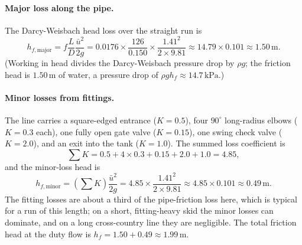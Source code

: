 \paragraph{Major loss along the pipe.} The Darcy-Weisbach head loss
over the straight run is
\[
h_{f,\text{major}} = f\frac{L}{D}\frac{\bar u^2}{2g} = 0.0176\times
\frac{126}{0.150}\times\frac{1.41^2}{2\times9.81} \approx 14.79\times
0.101 \approx 1.50\,\si{\meter}.
\]
(Working in head divides the Darcy-Weisbach pressure drop by $\rho g$;
the friction head is $1.50\,\si{\meter}$ of water, a pressure drop of
$\rho g h_f \approx 14.7\,\si{\kilo\pascal}$.)

\paragraph{Minor losses from fittings.} The line carries a
square-edged entrance ($K=0.5$), four $90^{\circ}$ long-radius elbows
($K=0.3$ each), one fully open gate valve ($K=0.15$), one swing check
valve ($K=2.0$), and an exit into the tank ($K=1.0$). The summed loss
coefficient is
\[
\sum K = 0.5 + 4\times0.3 + 0.15 + 2.0 + 1.0 = 4.85,
\]
and the minor-loss head is
\[
h_{f,\text{minor}} = \left(\sum K\right)\frac{\bar u^2}{2g} = 4.85
\times\frac{1.41^2}{2\times9.81} \approx 4.85\times0.101 \approx
0.49\,\si{\meter}.
\]
The fitting losses are about a third of the pipe-friction loss here,
which is typical for a run of this length; on a short, fitting-heavy
skid the minor losses can dominate, and on a long cross-country line
they are negligible. The total friction head at the duty flow is
$h_f = 1.50 + 0.49 \approx 1.99\,\si{\meter}$.

